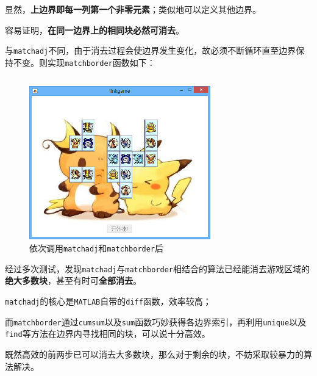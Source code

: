 \documentclass{article}
\numberwithin{figure}{section}
\numberwithin{table}{section}
\numberwithin{listing}{section}
\numberwithin{equation}{section}
\begin{document}
\begin{enumerate}
\begin{enumerate}
                        显然，\textbf{上边界即每一列第一个非零元素}；类似地可以定义其他边界。

                        容易证明，\textbf{在同一边界上的相同块必然可消去}。

                        与\texttt{matchadj}不同，由于消去过程会使边界发生变化，故必须不断循环直至边界保持不变。则实现\texttt{matchborder}函数如下：

                        \inputminted[firstline=79,lastline=135]{matlab}{../linkgame/omg.m}
                        \begingroup
                        \endgroup

                        \begin{figure}[H]
                            \centering
                            \includegraphics[width=0.7\textwidth]{match_border}
                            \caption{依次调用\texttt{matchadj}和\texttt{matchborder}后}
                            \label{fig:match_border}
                        \end{figure}

                        经过多次测试，发现\texttt{matchadj}与\texttt{matchborder}相结合的算法已经能消去游戏区域的\textbf{绝大多数块}，甚至有时可\textbf{全部消去}。

                        \texttt{matchadj}的核心是\texttt{MATLAB}自带的\texttt{diff}函数，效率较高；

                        而\texttt{matchborder}通过\texttt{cumsum}以及\texttt{sum}函数巧妙获得各边界索引，再利用\texttt{unique}以及\texttt{find}等方法在边界内寻找相同的块，可以说十分高效。

                        既然高效的前两步已可以消去大多数块，那么对于剩余的块，不妨采取较暴力的算法解决。


\end{enumerate}
\end{enumerate}
\end{document}
